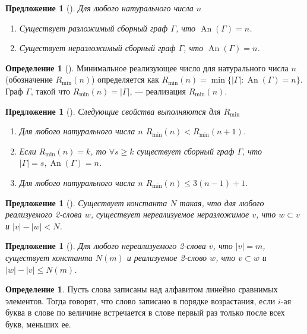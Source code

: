 \documentclass[a4paper,fleqn,12pt,top=0pt]{article}
\theoremstyle{plain}
\newtheorem{proposition}[theorem]{Предложение}
\theoremstyle{definition}
\newtheorem{definition}[theorem]{Определение}
\theoremstyle{remark}
\newcommand{\An}{\operatorname{An}}
\begin{document}
\begin{proposition}[]
    Для любого натурального числа $n$
    \begin{enumerate}
        \item Существует разложимый сборный граф $\Gamma$, что $\An(\Gamma) = n$.
        \item Существует неразложимый сборный граф $\Gamma$, что $\An(\Gamma) = n$.
    \end{enumerate}
\end{proposition}

\begin{definition}[]\label{rmin}
    Минимальное реализующее число для натурального числа $n$ (обозначение $R_{\min}(n)$) определяется как $R_{\min}(n) = \min\{|\Gamma|:\An(\Gamma) = n\}$. Граф $\Gamma$, такой что $R_{\min}(n) = |\Gamma|$, --- реализация $R_{\min}(n)$.
\end{definition}

\begin{proposition}[]
    Следующие свойства выполняются для $R_{\min}$
    \begin{enumerate}
        \item Для любого натурального числа $n$ $R_{\min}(n) < R_{\min}(n + 1)$.
        \item Если $R_{\min}(n) = k$, то $\forall s \geq k $ существует сборный граф $\Gamma$, что $|\Gamma| = s, \An(\Gamma) = n$.
        \item Для любого натурального числа $n$ $R_{\min}(n) \leq 3(n - 1) + 1$.
    \end{enumerate}
\end{proposition}

\begin{proposition}[]
    Существует константа $N$ такая, что для любого реализуемого 2-слова $w$, существует нереализуемое неразложимое $v$, что $w \subset v$ и $|v| - |w| < N$.
\end{proposition}

\begin{proposition}[]
    Для любого нереализуемого 2-слова $v$, что $|v| = m$, существует константа $N(m)$ и реализуемое 2-слово $w$, что $v \subset w$ и $|w| - |v| \leq N(m)$.
\end{proposition}

\begin{definition}
    Пусть слова записаны над алфавитом линейно сравнимых элементов. Тогда говорят, что слово записано в порядке возрастания, если $i$-ая буква в слове по величине встречается в слове первый раз только после всех букв, меньших ее.
\end{definition}
\end{document}
